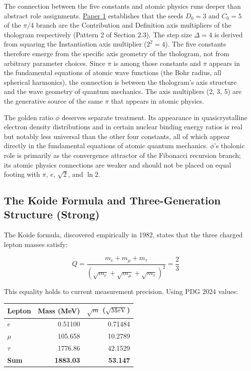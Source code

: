 \documentclass[12pt]{article}
\begin{document}
The connection between the five constants and atomic physics runs deeper
than abstract role assignments.
\href{https://github.com/baardev/truevalue/blob/main/docnav/Research/papers/1_recursive-tholonic-five-constants/1_recursive-tholonic-five-constants.pdf}{Paper
1} establishes that the seeds \(D_0 = 3\) and \(C_0 = 5\) of the
\(\pi/4\) branch are the Contribution and Definition axis multipliers of
the thologram respectively (Pattern 2 of Section 2.3). The step size
\(\Delta = 4\) is derived from squaring the Instantiation axis
multiplier (\(2^2 = 4\)). The five constants therefore emerge from the
specific axis geometry of the thologram, not from arbitrary parameter
choices. Since \(\pi\) is among those constants and \(\pi\) appears in
the fundamental equations of atomic wave functions (the Bohr radius, all
spherical harmonics), the connection is between the thologram's axis
structure and the wave geometry of quantum mechanics. The axis
multipliers (2, 3, 5) are the generative source of the same \(\pi\) that
appears in atomic physics.

The golden ratio \(\phi\) deserves separate treatment. Its appearance in
quasicrystalline electron density distributions and in certain nuclear
binding energy ratios is real but notably less universal than the other
four constants, all of which appear directly in the fundamental
equations of atomic quantum mechanics. \(\phi\)'s tholonic role is
primarily as the convergence attractor of the Fibonacci recursion
branch; its atomic physics connections are weaker and should not be
placed on equal footing with \(\pi\), \(e\), \(\sqrt{2}\), and
\(\ln 2\).

\subsection{The Koide Formula and Three-Generation Structure (Strong)}\label{the-koide-formula-and-three-generation-structure-strong}

The Koide formula, discovered empirically in 1982, states that the three
charged lepton masses satisfy:

\[Q = \frac{m_e + m_\mu + m_\tau}{(\sqrt{m_e} + \sqrt{m_\mu} + \sqrt{m_\tau})^2} = \frac{2}{3}\]

This equality holds to current measurement precision. Using PDG 2024
values:

\begin{longtable}[]{@{}lrr@{}}
\toprule\noalign{}
Lepton & Mass (MeV) & \(\sqrt{m}\) (\(\sqrt{\text{MeV}}\)) \\
\midrule\noalign{}
\endhead
\bottomrule\noalign{}
\endlastfoot
\(e\) & 0.51100 & 0.71484 \\
\(\mu\) & 105.658 & 10.2789 \\
\(\tau\) & 1776.86 & 42.1529 \\
\textbf{Sum} & \textbf{1883.03} & \textbf{53.147} \\
\end{longtable}
\end{document}
